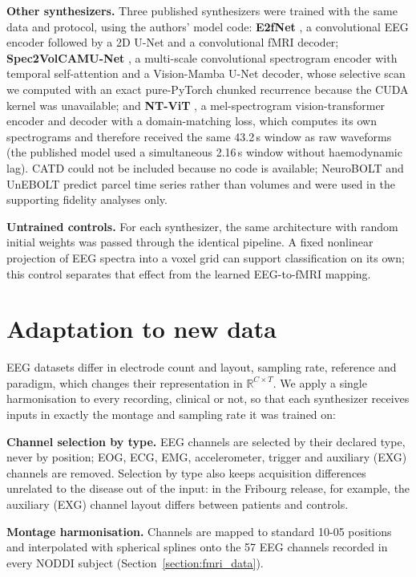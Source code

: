 \documentclass{article}
\begin{document}
\noindent\textbf{Other synthesizers.} Three published synthesizers were trained with the same data and protocol, using the authors' model code: \textbf{E2fNet} \cite{roos2025brainwaves}, a convolutional EEG encoder followed by a 2D U-Net and a convolutional fMRI decoder; \textbf{Spec2VolCAMU-Net} \cite{he2025spec2vol}, a multi-scale convolutional spectrogram encoder with temporal self-attention and a Vision-Mamba U-Net decoder, whose selective scan we computed with an exact pure-PyTorch chunked recurrence because the CUDA kernel was unavailable; and \textbf{NT-ViT} \cite{lanzino2024ntvit}, a mel-spectrogram vision-transformer encoder and decoder with a domain-matching loss, which computes its own spectrograms and therefore received the same 43.2\,s window as raw waveforms (the published model used a simultaneous 2.16\,s window without haemodynamic lag). CATD \cite{yao2025catd} could not be included because no code is available; NeuroBOLT and UnEBOLT \cite{li2024neurobolt,li2026unebolt} predict parcel time series rather than volumes and were used in the supporting fidelity analyses only.

\noindent\textbf{Untrained controls.} For each synthesizer, the same architecture with random initial weights was passed through the identical pipeline. A fixed nonlinear projection of EEG spectra into a voxel grid can support classification on its own; this control separates that effect from the learned EEG-to-fMRI mapping.

\section{Adaptation to new data}\label{section:adaptation}

EEG datasets differ in electrode count and layout, sampling rate, reference and paradigm, which changes their representation in $\mathbb{R}^{C \times T}$. We apply a single harmonisation to every recording, clinical or not, so that each synthesizer receives inputs in exactly the montage and sampling rate it was trained on:

\noindent\textbf{Channel selection by type.} EEG channels are selected by their declared type, never by position; EOG, ECG, EMG, accelerometer, trigger and auxiliary (EXG) channels are removed. Selection by type also keeps acquisition differences unrelated to the disease out of the input: in the Fribourg release, for example, the auxiliary (EXG) channel layout differs between patients and controls.

\noindent\textbf{Montage harmonisation.} Channels are mapped to standard 10-05 positions and interpolated with spherical splines onto the 57 EEG channels recorded in every NODDI subject (Section~\ref{section:fmri_data}).
\end{document}
